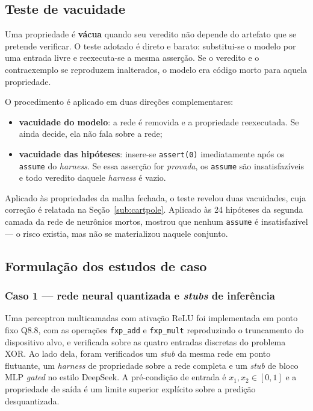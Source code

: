 \subsection{Teste de vacuidade}
\label{sub:vacuidade}

Uma propriedade é \textbf{vácua} quando seu veredito não depende do artefato que se pretende
verificar. O teste adotado é direto e barato: substitui-se o modelo por uma entrada livre e
reexecuta-se a mesma asserção. Se o veredito e o contraexemplo se reproduzem inalterados, o
modelo era código morto para aquela propriedade.

O procedimento é aplicado em duas direções complementares:

\begin{itemize}[leftmargin=1.4cm]
  \item \textbf{vacuidade do modelo}: a rede é removida e a propriedade reexecutada. Se ainda
  decide, ela não fala sobre a rede;
  \item \textbf{vacuidade das hipóteses}: insere-se \texttt{assert(0)} imediatamente após os
  \texttt{assume} do \textit{harness}. Se essa asserção for \emph{provada}, os \texttt{assume}
  são insatisfazíveis e todo veredito daquele \textit{harness} é vazio.
\end{itemize}

Aplicado às propriedades da malha fechada, o teste revelou duas vacuidades, cuja correção é
relatada na Seção~\ref{sub:cartpole}. Aplicado às 24 hipóteses da segunda camada da rede de
neurônios mortos, mostrou que nenhum \texttt{assume} é insatisfazível --- o risco existia,
mas não se materializou naquele conjunto.

\subsection{Formulação dos estudos de caso}

\subsubsection{Caso 1 --- rede neural quantizada e \textit{stubs} de inferência}

Uma perceptron multicamadas com ativação ReLU foi implementada em ponto fixo Q8.8, com as
operações \texttt{fxp\_add} e \texttt{fxp\_mult} reproduzindo o truncamento do dispositivo
alvo, e verificada sobre as quatro entradas discretas do problema XOR. Ao lado dela, foram
verificados um \textit{stub} da mesma rede em ponto flutuante, um \textit{harness} de
propriedade sobre a rede completa e um \textit{stub} de bloco MLP \textit{gated} no estilo
DeepSeek. A pré-condição de entrada é $x_1, x_2 \in [0,1]$ e a propriedade de saída é um
limite superior explícito sobre a predição desquantizada.

